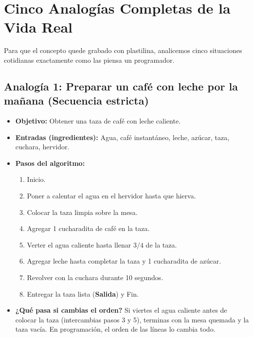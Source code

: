 \documentclass[11pt,letterpaper]{article}
\begin{document}
\section{Cinco Analogías Completas de la Vida Real}

Para que el concepto quede grabado con plastilina, analicemos cinco situaciones cotidianas exactamente como las piensa un programador.

\subsection{Analogía 1: Preparar un café con leche por la mañana (Secuencia estricta)}
\begin{itemize}
  \item \textbf{Objetivo:} Obtener una taza de café con leche caliente.
  \item \textbf{Entradas (ingredientes):} Agua, café instantáneo, leche, azúcar, taza, cuchara, hervidor.
  \item \textbf{Pasos del algoritmo:}
    \begin{enumerate}
      \item Inicio.
      \item Poner a calentar el agua en el hervidor hasta que hierva.
      \item Colocar la taza limpia sobre la mesa.
      \item Agregar 1 cucharadita de café en la taza.
      \item Verter el agua caliente hasta llenar $3/4$ de la taza.
      \item Agregar leche hasta completar la taza y 1 cucharadita de azúcar.
      \item Revolver con la cuchara durante 10 segundos.
      \item Entregar la taza lista (\textbf{Salida}) y Fin.
    \end{enumerate}
  \item \textbf{¿Qué pasa si cambias el orden?} Si viertes el agua caliente antes de colocar la taza (intercambias pasos 3 y 5), terminas con la mesa quemada y la taza vacía. En programación, el orden de las líneas lo cambia todo.
\end{itemize}
\end{document}

